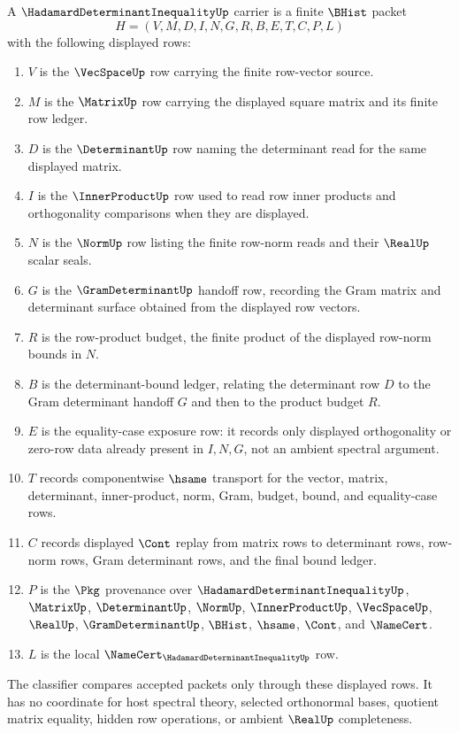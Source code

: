 \begin{definition}
\label{def:hadamard-determinant-inequality-carrier}
A $\HadamardDeterminantInequalityUp$ carrier is a finite $\BHist$ packet
$$
H=(V,M,D,I,N,G,R,B,E,T,C,P,L)
$$
with the following displayed rows:
\begin{enumerate}
\item $V$ is the $\VecSpaceUp$ row carrying the finite row-vector source.
\item $M$ is the $\MatrixUp$ row carrying the displayed square matrix and its
finite row ledger.
\item $D$ is the $\DeterminantUp$ row naming the determinant read for the same
displayed matrix.
\item $I$ is the $\InnerProductUp$ row used to read row inner products and
orthogonality comparisons when they are displayed.
\item $N$ is the $\NormUp$ row listing the finite row-norm reads and their
$\RealUp$ scalar seals.
\item $G$ is the $\GramDeterminantUp$ handoff row, recording the Gram matrix
and determinant surface obtained from the displayed row vectors.
\item $R$ is the row-product budget, the finite product of the displayed
row-norm bounds in $N$.
\item $B$ is the determinant-bound ledger, relating the determinant row $D$ to
the Gram determinant handoff $G$ and then to the product budget $R$.
\item $E$ is the equality-case exposure row: it records only displayed
orthogonality or zero-row data already present in $I,N,G$, not an ambient
spectral argument.
\item $T$ records componentwise $\hsame$ transport for the vector, matrix,
determinant, inner-product, norm, Gram, budget, bound, and equality-case rows.
\item $C$ records displayed $\Cont$ replay from matrix rows to determinant
rows, row-norm rows, Gram determinant rows, and the final bound ledger.
\item $P$ is the $\Pkg$ provenance over
$\HadamardDeterminantInequalityUp$, $\MatrixUp$, $\DeterminantUp$, $\NormUp$,
$\InnerProductUp$, $\VecSpaceUp$, $\RealUp$, $\GramDeterminantUp$, $\BHist$,
$\hsame$, $\Cont$, and $\NameCert$.
\item $L$ is the local $\NameCert_{\HadamardDeterminantInequalityUp}$ row.
\end{enumerate}
The classifier compares accepted packets only through these displayed rows.
It has no coordinate for host spectral theory, selected orthonormal bases,
quotient matrix equality, hidden row operations, or ambient $\RealUp$
completeness.
\end{definition}

